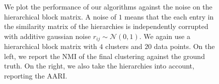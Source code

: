 \begin{figure}[ht]
    \centering
    \caption{
        We plot the performance of our algorithms against the noise on the hierarchical block matrix. A noise of $1$ means that the each 
        entry in the similarity matrix of the hierarchies is independently corrupted with additive gaussian noise $r_{ij} \sim \mathcal{N}(0, 1)$.
        We again use a hierarchical block matrix with $4$ clusters and $20$ data points. On the left, we report the NMI of the final clustering against the ground
        truth. On the right, we also take the hierarchies into account, reporting the AARI.
    }
    \label{fig:hierarchy-add-hierarchy-noise}
\end{figure}


